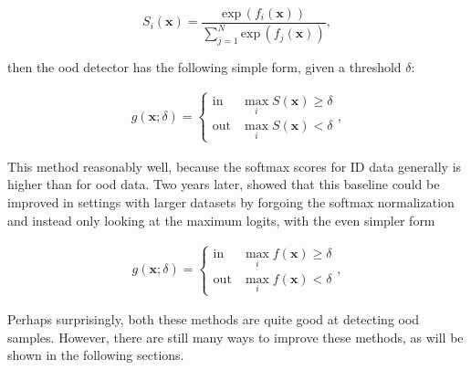 \documentclass[UKenglish]{uiomasterthesis} %
\theoremstyle{definition}
\begin{document}
\begin{equation}
    S_i(\bm{x}) = \frac{\text{exp} \, (f_i(\bm{x}))}{\sum^N_{j=1} \text{exp} \, (f_j(\bm{x}))},
\label{softmax}
\end{equation}

then the \ac{ood} detector has the following simple form, given a threshold $\delta$:

\begin{align}
\label{eq:msp}
    g(\bm{x}; \delta)=\begin{cases} 
        \text{in } & \max_i S(\bm{x})\ge \delta \\
        \text{out} & \max_i S(\bm{x}) < \delta 
   \end{cases},
\end{align}

This method reasonably well, because the softmax scores for ID data generally is higher than for \ac{ood} data. Two years later, \cite{mls} showed that this baseline could be improved in settings with larger datasets by forgoing the softmax normalization and instead only looking at the maximum logits, with the even simpler form

\begin{align}
\label{eq:msp}
    g(\bm{x}; \delta)=\begin{cases} 
        \text{in } & \max_i f(\bm{x})\ge \delta \\
        \text{out} & \max_i f(\bm{x}) < \delta 
   \end{cases},
\end{align}

Perhaps surprisingly, both these methods are quite good at detecting \ac{ood} samples. However, there are still many ways to improve these methods, as will be shown in the following sections.
\\
\end{document}
